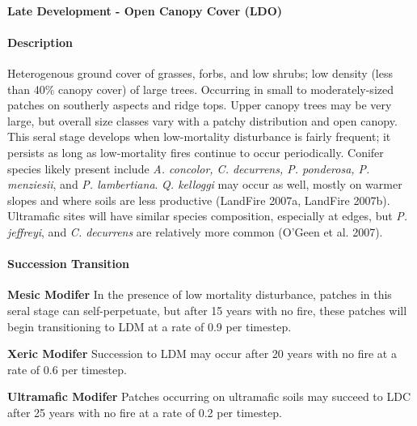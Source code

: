 \noindent\hrulefill


\paragraph{Late Development - Open Canopy Cover (LDO)}

\paragraph{Description} Heterogenous ground cover of grasses, forbs, and low shrubs; low density (less than 40\% canopy cover) of large trees. Occurring in small to moderately-sized patches on southerly aspects and ridge tops. Upper canopy trees may be very large, but overall size classes vary with a patchy distribution and open canopy. This seral stage develops when low-mortality disturbance is fairly frequent; it persists as long as low-mortality fires continue to occur periodically. Conifer species likely present include \emph{A. concolor, C. decurrens, P. ponderosa, P. menziesii}, and \emph{P. lambertiana}. \emph{Q. kelloggi} may occur as well, mostly on warmer slopes and where soils are less productive (LandFire 2007a, LandFire 2007b). Ultramafic sites will have similar species composition, especially at edges, but \emph{P. jeffreyi}, and \emph{C. decurrens} are relatively more common (O’Geen et al. 2007).


\paragraph{Succession Transition}
\begin{adjustwidth}{2cm}{}
\textbf{Mesic Modifer } In the presence of low mortality disturbance, patches in this seral stage can self-perpetuate, but after 15 years with no fire, these patches will begin transitioning to LDM at a rate of 0.9 per timestep.

\textbf{Xeric Modifer}  Succession to LDM may occur after 20 years with no fire at a rate of 0.6 per timestep. 

\textbf{Ultramafic Modifer} Patches occurring on ultramafic soils may succeed to LDC after 25 years with no fire at a rate of 0.2 per timestep.

\end{adjustwidth}

